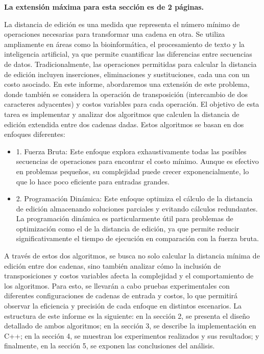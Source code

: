 \begin{mdframed}
    \textbf{La extensión máxima para esta sección es de 2 páginas.}
\end{mdframed}

La distancia de edición es una medida que representa el número mínimo de operaciones necesarias para transformar una cadena en otra. Se utiliza ampliamente en áreas como la bioinformática, el procesamiento de texto y la inteligencia artificial, ya que permite cuantificar las diferencias entre secuencias de datos. Tradicionalmente, las operaciones permitidas para calcular la distancia de edición incluyen inserciones, eliminaciones y sustituciones, cada una con un costo asociado. En este informe, abordaremos una extensión de este problema, donde también se considera la operación de transposición (intercambio de dos caracteres adyacentes) y costos variables para cada operación.
El objetivo de esta tarea es implementar y analizar dos algoritmos que calculen la distancia de edición extendida entre dos cadenas dadas. Estos algoritmos se basan en dos enfoques diferentes:

\begin{itemize}
\item1.	Fuerza Bruta: Este enfoque explora exhaustivamente todas las posibles secuencias de operaciones para encontrar el costo mínimo. Aunque es efectivo en problemas pequeños, su complejidad puede crecer exponencialmente, lo que lo hace poco eficiente para entradas grandes.
\item2.	Programación Dinámica: Este enfoque optimiza el cálculo de la distancia de edición almacenando soluciones parciales y evitando cálculos redundantes. La programación dinámica es particularmente útil para problemas de optimización como el de la distancia de edición, ya que permite reducir significativamente el tiempo de ejecución en comparación con la fuerza bruta.
\end{itemize}
A través de estos dos algoritmos, se busca no solo calcular la distancia mínima de edición entre dos cadenas, sino también analizar cómo la inclusión de transposiciones y costos variables afecta la complejidad y el comportamiento de los algoritmos. Para esto, se llevarán a cabo pruebas experimentales con diferentes configuraciones de cadenas de entrada y costos, lo que permitirá observar la eficiencia y precisión de cada enfoque en distintos escenarios.
La estructura de este informe es la siguiente: en la sección 2, se presenta el diseño detallado de ambos algoritmos; en la sección 3, se describe la implementación en C++; en la sección 4, se muestran los experimentos realizados y sus resultados; y finalmente, en la sección 5, se exponen las conclusiones del análisis.

